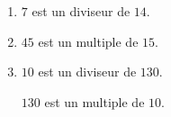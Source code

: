     \begin{enumerate}
        \item $7$ est un diviseur de $14$.
        \item $45$ est un multiple de $15$.
        \item $10$ est un diviseur de $130$.

        $130$ est un multiple de $10$.
    \end{enumerate}
